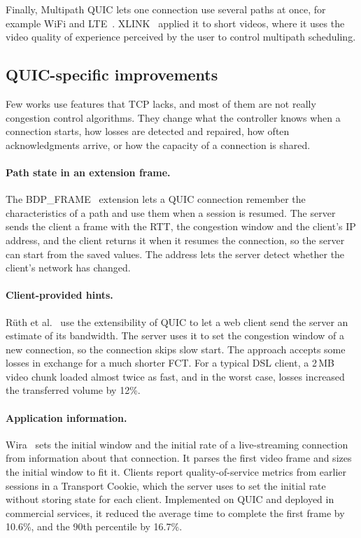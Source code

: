 Finally, Multipath QUIC lets one connection use several paths at once, for example
WiFi and LTE~\cite{deconinck2017mpquic}. XLINK~\cite{zheng2021xlink} applied it to short
videos, where it uses the video quality of experience perceived by the user
to control multipath scheduling.

\subsection{QUIC-specific improvements}\label{sec:rw-quic-specific}

Few works use features that TCP lacks, and most of them are not really congestion control
algorithms. They change what the controller knows when a connection starts, how losses
are detected and repaired, how often acknowledgments arrive, or how the capacity of a
connection is shared.

\paragraph{Path state in an extension frame.} The BDP\_FRAME~\cite{kuhn2021bdpframe} extension lets a QUIC
connection remember the characteristics of a path and use them when a session is
resumed. The server sends the client a frame with the RTT, the
congestion window and the client's IP address, and the client returns it when it
resumes the connection, so the server can start from the saved values. The address
lets the server detect whether the client's network has changed.

\paragraph{Client-provided hints.} Rüth et al.~\cite{ruth2019blitz} use the extensibility of QUIC to let a web client send the server an estimate of its bandwidth. The
server uses it to set the congestion window of a new connection, so the connection
skips slow start. The approach accepts some losses in exchange for a much shorter
FCT. For a typical DSL client, a 2\,MB video chunk loaded almost twice as fast, and in
the worst case, losses increased the transferred volume by 12\%.

\paragraph{Application information.} Wira~\cite{wu2024wira} sets the initial window and the initial rate
of a live-streaming connection from information about that
connection. It parses the first video frame and sizes the initial
window to fit it. Clients report quality-of-service metrics from earlier sessions in a
Transport Cookie, which the server uses to set the initial rate without storing state
for each client. Implemented on QUIC and deployed in commercial services, it reduced
the average time to complete the first frame by 10.6\%, and the 90th percentile by
16.7\%.

